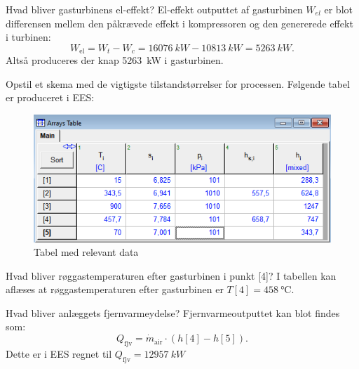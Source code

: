\documentclass[a4paper]{article}
\begin{document}
 Hvad bliver gasturbinens el-effekt?
\bigbreak
El-effekt outputtet af gasturbinen $W_{el}$ er blot differensen mellem den påkrævede effekt i kompressoren og den genererede effekt i turbinen:
\[ 
W_{\mathrm{el}} = W_t - W_c = \qty{16076}{kW} - \qty{10813}{kW} = \qty{5263}{kW}
.\]
Altså produceres der knap \qty{5263}{kW} i gasturbinen.


 Opstil et skema med de vigtigste tilstandstørrelser for processen.
\bigbreak
Følgende tabel er produceret i EES:
\begin{figure} [ht]
  \centering
  \includegraphics[width=0.5\linewidth]{./figures/p2_2.png}
  \caption{Tabel med relevant data}
  \label{fig:p2_2}
\end{figure}

 Hvad bliver røggastemperaturen efter gasturbinen i punkt [4]?
\bigbreak
I tabellen kan aflæses at røggastemperaturen efter gasturbinen er $T[4] = \qty{458}{\celsius}$. 

 Hvad bliver anlæggets fjernvarmeydelse?
\bigbreak
Fjernvarmeoutputtet kan blot findes som:
\[ 
  Q_{\mathrm{fjv}} = \dot{m}_{\mathrm{air}} \cdot \left( h[4] - h[5] \right)
.\]
Dette er i EES regnet til $Q_{\mathrm{fjv}} = \qty{12957}{kW} $
\end{document}
